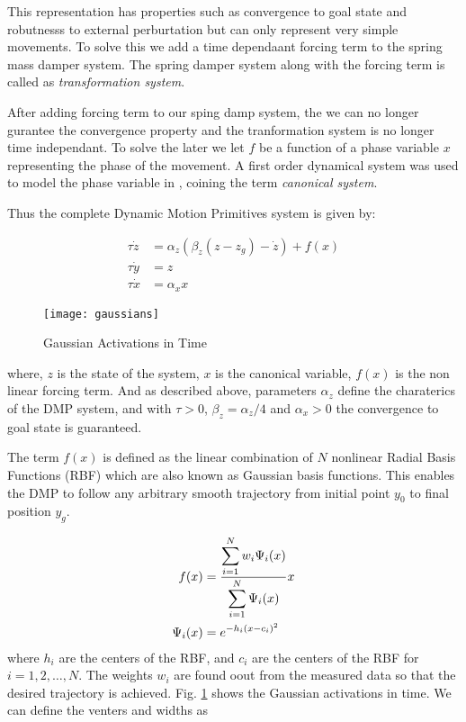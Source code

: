 This representation has properties such as convergence to goal state and robutnesss to external perburtation but
can only represent very simple movements. To solve this we add a time dependaant forcing term to the spring mass damper system. The spring damper system
along with the forcing term is called as \textit{transformation system}.

After adding forcing term to our sping damp system, the we can no longer gurantee the convergence property and the tranformation system is no longer time independant.
To solve the later we let $f$ be a function of a phase variable $x$ representing the phase of the movement. A first order dynamical system
was used to model the phase variable in \cite{Ijspeert2002}, coining the term \textit{canonical system}.

Thus the complete Dynamic Motion Primitives system is given by:

\begin{subequations}\label{eq:dmpSystem}
    
    \begin{align}
        \tau \dot{z}& = \alpha_z (\beta_z \left( z - z_g \right) - \dot{z}) + f(x)\label{Tsystem}\\
        \tau \dot{y}& = z \\
        \tau \dot{x}& = \alpha_x x\label{cSystem}
    \end{align}
\end{subequations}

\begin{figure}[h]
    \centering
    \texttt{[image: gaussians]}
    \caption{Gaussian Activations in Time}
    \label{fig:gaussians}
\end{figure}
where, $z$ is the state of the system, $x$ is the canonical variable, $f(x)$ is the non linear forcing term. And as described above, parameters
$\alpha_z$ define the charaterics of the DMP system, and with $\tau > 0 $, $\beta_z =  \alpha_z/4$ and $\alpha_x >0$ the convergence to 
goal state is guaranteed.

The term $f(x)$ is defined as the linear combination of $N$ nonlinear Radial Basis Functions (RBF) which are also known as Gaussian basis functions.
This enables the DMP to follow any arbitrary smooth trajectory from initial point $y_0$ to final position $y_g$.

\begin{align}\label{eq:dmp_rbf}
    f(x) &= \frac{\displaystyle \sum\limits_{i=1}^{N} w_i \Psi_i(x)}{\displaystyle \sum\limits_{i=1}^N \Psi_i(x)}  x\\
    \Psi_i(x) &= e^{-h_i(x-c_i)^2}
\end{align}
where $h_i$ are the centers of the RBF, and $c_i$ are the centers of the RBF for $i = 1,2, \dots , N$. The weights $w_i$ are found oout from the measured 
data so that the desired trajectory is achieved. Fig. \ref{fig:gaussians} shows the Gaussian activations in time.
We can define the venters and widths as


